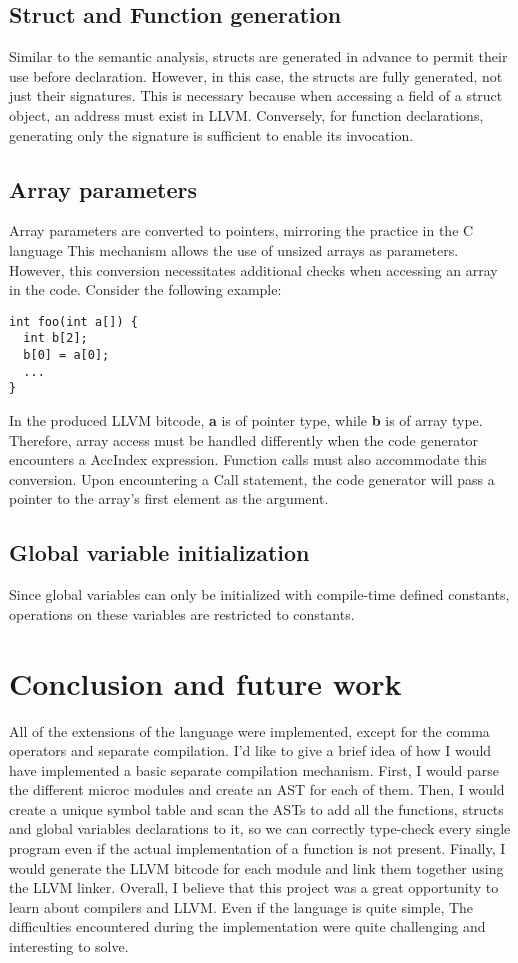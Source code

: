 \documentclass{article}
\begin{document}
\subsection*{Struct and Function generation}
Similar to the semantic analysis, structs are generated in advance to
permit their use before declaration. However, in this case, the structs
are fully generated, not just their signatures.
This is necessary because when accessing a field of a struct object,
an address must exist in LLVM. Conversely, for function declarations,
generating only the signature is sufficient to enable its invocation.

\subsection*{Array parameters}
Array parameters are converted to pointers, mirroring the practice in the C language
This mechanism allows the use of unsized arrays as parameters.
However, this conversion necessitates additional checks when accessing an array in the code.
Consider the following example:
\begin{lstlisting}[basicstyle=\ttfamily\fontsize{8pt}{14pt}, keywordstyle=\color{blue}, commentstyle=\color{green}]
int foo(int a[]) {
  int b[2];
  b[0] = a[0];
  ...
}
\end{lstlisting}
In the produced LLVM bitcode, \textbf{a} is of pointer type, while \textbf{b} is of array type. Therefore, array access must be handled differently when
the code generator encounters a AccIndex expression.
Function calls must also accommodate this conversion. Upon encountering a Call statement,
the code generator will pass a pointer to the array's first element as the argument.

\subsection*{Global variable initialization}
Since global variables can only be initialized with compile-time defined constants, operations on these variables are restricted to constants.

\section{Conclusion and future work}
All of the extensions of the language were implemented, except for the comma operators and separate compilation.
I'd like to give a brief idea of how I would have implemented a basic separate compilation mechanism.
First, I would parse the different microc modules and create an AST for each of them.
Then, I would create a unique symbol table and scan the ASTs to add all the functions, structs and global variables declarations to it,
so we can correctly type-check every single program even if the actual implementation of a function is not present.
Finally, I would generate the LLVM bitcode for each module and link them together using the LLVM linker.
Overall, I believe that this project was a great opportunity to learn about compilers and LLVM.
Even if the language is quite simple, The difficulties encountered during the implementation were quite challenging and interesting to solve.
\end{document}
